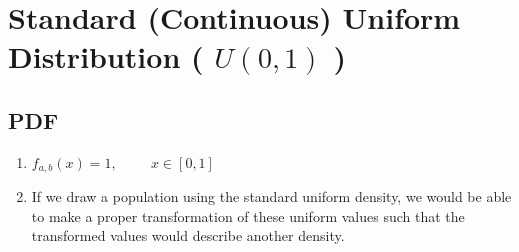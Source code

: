 \section{Standard (Continuous) Uniform Distribution ( $U(0, 1)$ )}

\subsection{PDF}

\begin{enumerate}
    \item[] $f_{a,b}(x) = 1, \hspace{1cm} x \in [0, 1]$
    \hfill \cite{statistics/book/Statistics-for-Data-Scientists/Maurits-Kaptein}

    \item If we draw a population using the standard uniform density, we would be able to make a proper transformation of these uniform values such that the transformed values would describe another density.
    \hfill \cite{statistics/book/Statistics-for-Data-Scientists/Maurits-Kaptein}
\end{enumerate}








